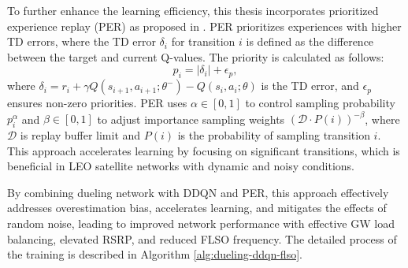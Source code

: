 To further enhance the learning efficiency, this thesis incorporates prioritized experience replay (PER) as proposed in \cite{schaul2015prioritized}. PER prioritizes experiences with higher TD errors, where the TD error \(\delta_i\) for transition \(i\) is defined as the difference between the target and current Q-values. The priority is calculated as follows:
\begin{equation}
p_i = |\delta_i| + \epsilon_p,
\label{eq:priority}
\end{equation}
where \( \delta_i = r_i + \gamma Q(s_{i+1}, a_{i+1}; \theta^-) - Q(s_i, a_i; \theta) \) is the TD error, and \( \epsilon_p \) ensures non-zero priorities. PER uses \( \alpha \in [0, 1] \) to control sampling probability \(p_i^\alpha \) and \( \beta \in [0, 1] \) to adjust importance sampling weights \((\mathcal D \cdot P(i))^{-\beta} \), where \( \mathcal D \) is replay buffer limit and \(P(i)\) is the probability of sampling transition \(i\). This approach accelerates learning by focusing on significant transitions, which is beneficial in LEO satellite networks with dynamic and noisy conditions.

By combining dueling network with DDQN and PER, this approach effectively addresses overestimation bias, accelerates learning, and mitigates the effects of random noise, leading to improved network performance with effective GW load balancing, elevated RSRP, and reduced FLSO frequency. The detailed process of the training is described in Algorithm \ref{alg:dueling-ddqn-flso}.

